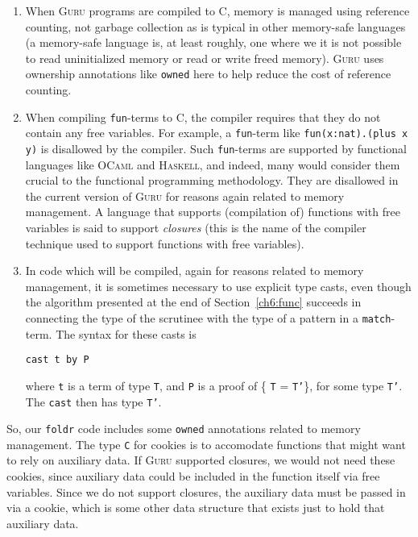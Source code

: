 \documentclass{book}[12pt]
\newcommand{\guru}[0]{\textsc{Guru}\xspace}
\begin{document}
\begin{enumerate}
\item When \guru programs are compiled to C, memory is managed using
reference counting, not garbage collection as is typical in other
memory-safe languages (a memory-safe language is, at least roughly,
one where we it is not possible to read uninitialized memory or read
or write freed memory).  \guru uses ownership annotations like
\texttt{owned} here to help reduce the cost of reference counting.

\item When compiling \texttt{fun}-terms to C, the compiler requires
that they do not contain any free variables.  For example, a
\texttt{fun}-term like \texttt{fun(x:nat).(plus x y)} is disallowed by
the compiler.  Such \texttt{fun}-terms are supported by functional
languages like \textsc{OCaml} and \textsc{Haskell}, and indeed, many
would consider them crucial to the functional programming methodology.
They are disallowed in the current version of \guru for reasons again
related to memory management.  A language that supports (compilation
of) functions with free variables is said to support \emph{closures}
(this is the name of the compiler technique used to support functions
with free variables).

\item In code which will be compiled, again for reasons related to
memory management, it is sometimes necessary to use explicit type
casts, even though the algorithm presented at the end of
Section~\ref{ch6:func} succeeds in connecting the type of the
scrutinee with the type of a pattern in a \texttt{match}-term.
The syntax for these casts is

\begin{verbatim}
cast t by P
\end{verbatim}

\noindent where \texttt{t} is a term of type \texttt{T}, and \texttt{P} is
a proof of \{ \texttt{T} = \texttt{T'}\}, for some type \texttt{T'}.  The
\texttt{cast} then has type \texttt{T'}.  

\end{enumerate}

\noindent So, our \texttt{foldr} code includes some \texttt{owned}
annotations related to memory management.  The type \texttt{C} for
cookies is to accomodate functions that might want to rely on
auxiliary data.  If \guru supported closures, we would not need these
cookies, since auxiliary data could be included in the function itself
via free variables.  Since we do not support closures, the auxiliary
data must be passed in via a cookie, which is some other data
structure that exists just to hold that auxiliary data.
\end{document}
